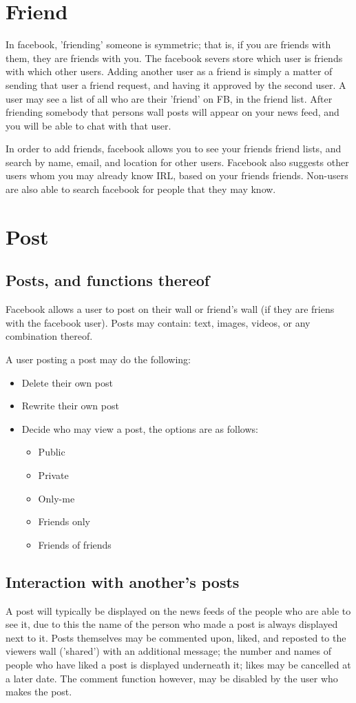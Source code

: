 \section{Friend}
In facebook, 'friending' someone is symmetric; that is, if you are friends with
them, they are friends with you. The facebook severs store which user is friends
with which other users. Adding another user as a friend is simply a matter of
sending that user a friend request, and having it approved by the second user. A
user may see a list of all who are their 'friend' on FB, in the friend list.
After friending somebody that persons wall posts will appear on your news feed,
and you will be able to chat with that user.

In order to add friends, facebook allows you to see your friends friend lists,
and search by name, email, and location for other users. Facebook also suggests
other users whom you may already know IRL, based on your friends friends.
Non-users are also able to search facebook for people that they may know.

\section{Post}
\subsection{Posts, and functions thereof}
Facebook allows a user to post on their wall or friend's wall (if they are
friens with the facebook user). Posts may contain: text, images, videos, or any
combination thereof.

A user posting a post may do the following:
\begin{itemize}
\item Delete their own post
\item Rewrite their own post
\item Decide who may view a post, the options are as follows:
    \begin{itemize}
    \item Public
    \item Private
    \item Only-me
    \item Friends only
    \item Friends of friends
    \end{itemize}
\end{itemize}

\subsection{Interaction with another's posts}
A post will typically be displayed on the news feeds of the people who are able
to see it, due to this the name of the person who made a post is always
displayed next to it. Posts themselves may be commented upon, liked, and
reposted to the viewers wall ('shared') with an additional message; the number
and names of people who have liked a post is displayed underneath it; likes may
be cancelled at a later date. The comment function however, may be disabled by
the user who makes the post.

